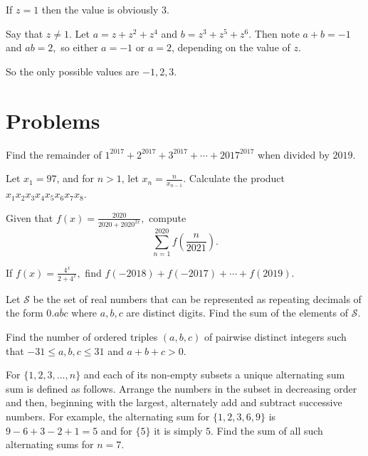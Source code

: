 \documentclass{article}
\begin{document}
\begin{sol}
If $z=1$ then the value is obviously $3.$

Say that $z\neq 1.$ Let $a=z+z^2+z^4$ and $b=z^3+z^5+z^6.$ Then note $a+b=-1$ and $ab=2,$ so either $a=-1$ or $a=2$, depending on the value of $z.$

So the only possible values are $-1,2,3.$
\end{sol}

\pagebreak

\section{Problems}



\begin{prob}[]{2}
Find the remainder of $1^{2017}+2^{2017}+3^{2017}+\cdots+2017^{2017}$ when divided by $2019.$
\end{prob}

\begin{prob}[AIME 1985/1]{2}
Let $x_1=97$, and for $n>1$, let $x_n=\frac{n}{x_{n-1}}$. Calculate the product $x_1x_2x_3x_4x_5x_6x_7x_8$.
\end{prob}

\begin{prob}[TrinMaC 2020/16]{3}
Given that $f(x)=\frac{2020}{2020+2020^{2x}},$ compute \[\sum\limits_{n=1}^{2020}f\left(\frac{n}{2021}\right).\]
\end{prob}

\begin{prob}[]{3}
If $f(x)=\frac{4^x}{2+4^x},$ find $f(-2018)+f(-2017)+\cdots+f(2019).$
\end{prob}

\begin{prob}[AIME I 2006/6]{3}
Let $\mathcal{S}$ be the set of real numbers that can be represented as repeating decimals of the form $0.\overline{abc}$ where $a, b, c$ are distinct digits. Find the sum of the elements of $\mathcal{S}.$
\end{prob}

\begin{req}{3}
Find the number of ordered triples $(a,b,c)$ of pairwise distinct integers such that $-31\leq a,b,c\leq 31$ and $a+b+c >0.$
\end{req}

\begin{prob}[AIME 1983/13]{4}
For $\{1, 2, 3, \ldots, n\}$ and each of its non-empty subsets a unique alternating sum sum is defined as follows. Arrange the numbers in the subset in decreasing order and then, beginning with the largest, alternately add and subtract successive numbers. For example, the alternating sum for $\{1, 2, 3, 6,9\}$ is $9-6+3-2+1=5$ and for $\{5\}$ it is simply $5$. Find the sum of all such alternating sums for $n=7$.
\end{prob}
\end{document}
